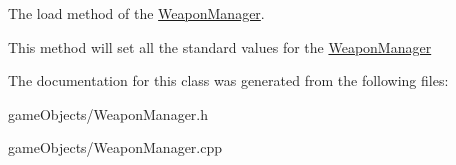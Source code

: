 The load method of the \hyperlink{class_weapon_manager}{Weapon\+Manager}. 

This method will set all the standard values for the \hyperlink{class_weapon_manager}{Weapon\+Manager} 

The documentation for this class was generated from the following files\+:\begin{DoxyCompactItemize}
\item 
game\+Objects/Weapon\+Manager.\+h\item 
game\+Objects/Weapon\+Manager.\+cpp\end{DoxyCompactItemize}
